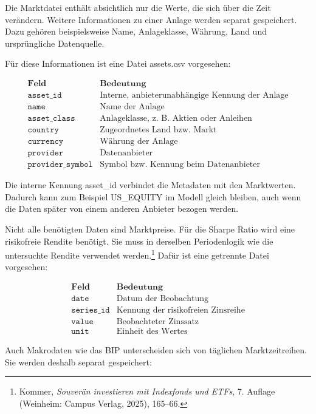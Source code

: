 \documentclass[
  ngerman,
  a4paper,
  DIV=11,
  oneside]{scrreprt}
\begin{document}
Die Marktdatei enthält absichtlich nur die Werte, die sich über die Zeit
verändern. Weitere Informationen zu einer Anlage werden separat
gespeichert. Dazu gehören beispielsweise Name, Anlageklasse, Währung,
Land und ursprüngliche Datenquelle.

Für diese Informationen ist eine Datei assets.csv vorgesehen:

\[
\begin{array}{c|c}
\textbf{Feld} & \textbf{Bedeutung} \\
\hline
\texttt{asset\_id} & \text{Interne, anbieterunabhängige Kennung der Anlage} \\
\texttt{name} & \text{Name der Anlage} \\
\texttt{asset\_class} & \text{Anlageklasse, z. B. Aktien oder Anleihen} \\
\texttt{country} & \text{Zugeordnetes Land bzw. Markt} \\
\texttt{currency} & \text{Währung der Anlage} \\
\texttt{provider} & \text{Datenanbieter} \\
\texttt{provider\_symbol} & \text{Symbol bzw. Kennung beim Datenanbieter}
\end{array}
\]

Die interne Kennung asset\_id verbindet die Metadaten mit den
Marktwerten. Dadurch kann zum Beispiel US\_EQUITY im Modell gleich
bleiben, auch wenn die Daten später von einem anderen Anbieter bezogen
werden.

Nicht alle benötigten Daten sind Marktpreise. Für die Sharpe Ratio wird
eine risikofreie Rendite benötigt. Sie muss in derselben Periodenlogik
wie die untersuchte Rendite verwendet werden.\footnote{Kommer,
  \emph{Souverän investieren mit Indexfonds und ETFs}, 7. Auflage
  (Weinheim: Campus Verlag, 2025), 165--66.} Dafür ist eine getrennte
Datei vorgesehen:

\[
\begin{array}{c|c}
\textbf{Feld} & \textbf{Bedeutung} \\
\hline
\texttt{date} & \text{Datum der Beobachtung} \\
\texttt{series\_id} & \text{Kennung der risikofreien Zinsreihe} \\
\texttt{value} & \text{Beobachteter Zinssatz} \\
\texttt{unit} & \text{Einheit des Wertes}
\end{array}
\]

Auch Makrodaten wie das BIP unterscheiden sich von täglichen
Marktzeitreihen. Sie werden deshalb separat gespeichert:
\end{document}
